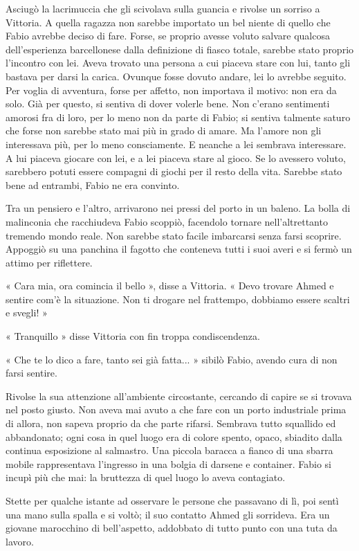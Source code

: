 Asciugò la lacrimuccia che gli scivolava sulla guancia e rivolse un sorriso a Vittoria. A quella ragazza non sarebbe importato un bel niente di quello che Fabio avrebbe deciso di fare. Forse, se proprio avesse voluto salvare qualcosa dell'esperienza barcellonese dalla definizione di fiasco totale, sarebbe stato proprio l'incontro con lei. Aveva trovato una persona a cui piaceva stare con lui, tanto gli bastava per darsi la carica. Ovunque fosse dovuto andare, lei lo avrebbe seguito. Per voglia di avventura, forse per affetto, non importava il motivo: non era da solo. Già per questo, si sentiva di dover volerle bene. Non c'erano sentimenti amorosi fra di loro, per lo meno non da parte di Fabio; si sentiva talmente saturo che forse non sarebbe stato mai più in grado di amare. Ma l'amore non gli interessava più, per lo meno consciamente. E neanche a lei sembrava interessare. A lui piaceva giocare con lei, e a lei piaceva stare al gioco. Se lo avessero voluto, sarebbero potuti essere compagni di giochi per il resto della vita. Sarebbe stato bene ad entrambi, Fabio ne era convinto.

Tra un pensiero e l'altro, arrivarono nei pressi del porto in un baleno. La bolla di malinconia che racchiudeva Fabio scoppiò, facendolo tornare nell'altrettanto tremendo mondo reale. Non sarebbe stato facile imbarcarsi senza farsi scoprire. Appoggiò su una panchina il fagotto che conteneva tutti i suoi averi e si fermò un attimo per riflettere.

« Cara mia, ora comincia il bello », disse a Vittoria. « Devo trovare Ahmed e sentire com'è la situazione. Non ti drogare nel frattempo, dobbiamo essere scaltri e svegli! »

« Tranquillo » disse Vittoria con fin troppa condiscendenza.

« Che te lo dico a fare, tanto sei già fatta... » sibilò Fabio, avendo cura di non farsi sentire.

Rivolse la sua attenzione all'ambiente circostante, cercando di capire se si trovava nel posto giusto. Non aveva mai avuto a che fare con un porto industriale prima di allora, non sapeva proprio da che parte rifarsi. Sembrava tutto squallido ed abbandonato; ogni cosa in quel luogo era di colore spento, opaco, sbiadito dalla continua esposizione al salmastro. Una piccola baracca a fianco di una sbarra mobile rappresentava l'ingresso in una bolgia di darsene e container. Fabio si incupì più che mai: la bruttezza di quel luogo lo aveva contagiato.

Stette per qualche istante ad osservare le persone che passavano di lì, poi sentì una mano sulla spalla e si voltò; il suo contatto Ahmed gli sorrideva. Era un giovane marocchino di bell'aspetto, addobbato di tutto punto con una tuta da lavoro.

